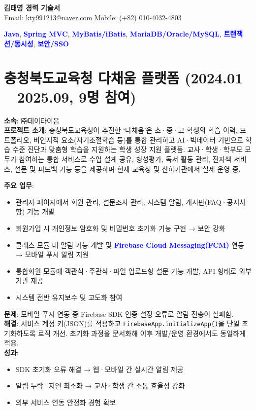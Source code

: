 \documentclass[a4paper,11pt]{article}
\newcommand{\tech}[1]{\textbf{\textcolor{blue}{#1}}}
\begin{document}
\begin{center}
    {\LARGE \textbf{김태영 경력 기술서}} \\[6pt]
    Email: \href{mailto:kty991213@naver.com}{kty991213@naver.com} \quad
    Mobile: (+82) 010-4032-4803
\end{center}

\vspace{0.5cm}

\noindent \tech{Java}, \tech{Spring MVC}, \tech{MyBatis/iBatis}, \tech{MariaDB/Oracle/MySQL}, \tech{트랜잭션/동시성}, \tech{보안/SSO}

\section{충청북도교육청 다채움 플랫폼 (2024.01 ~ 2025.09, 9명 참여)}

\textbf{소속}: ㈜데이타이음 \\
\textbf{프로젝트 소개}:  
충청북도교육청이 추진한 ‘다채움’은 초·중·고 학생의 학습 이력, 포트폴리오,  
비인지적 요소(자기조절학습 등)를 통합 관리하고 AI·빅데이터 기반으로 학습 수준 진단과  
맞춤형 학습을 지원하는 학생 성장 지원 플랫폼.  
교사·학생·학부모 모두가 참여하는 통합 서비스로 수업 설계 공유, 형성평가, 독서 활동 관리,  
전자책 서비스, 설문 및 피드백 기능 등을 제공하며 현재 교육청 및 산하기관에서 실제 운영 중.

\textbf{주요 업무}:
\begin{itemize}[leftmargin=*]
  \item 관리자 페이지에서 회원 관리, 설문조사 관리, 시스템 알림, 게시판(FAQ·공지사항) 기능 개발
  \item 회원가입 시 개인정보 암호화 및 비밀번호 초기화 기능 구현 → 보안 강화
  \item 클래스 모듈 내 알림 기능 개발 및 \tech{Firebase Cloud Messaging(FCM)} 연동 → 모바일 푸시 알림 지원
  \item 통합회원 모듈에 객관식·주관식·파일 업로드형 설문 기능 개발, API 형태로 외부 기관 제공
  \item 시스템 전반 유지보수 및 고도화 참여
\end{itemize}

\textbf{문제}: 모바일 푸시 연동 중 Firebase SDK 인증 설정 오류로 알림 전송이 실패함. \\
\textbf{해결}: 서비스 계정 키(JSON)를 적용하고 \verb|FirebaseApp.initializeApp()|을 단일 초기화하도록 로직 개선. 초기화 과정을 문서화해 이후 개발/운영 환경에서도 동일하게 적용. \\
\textbf{성과}:
\begin{itemize}[leftmargin=*]
  \item SDK 초기화 오류 해결 → 웹·모바일 간 실시간 알림 제공
  \item 알림 누락·지연 최소화 → 교사·학생 간 소통 효율성 강화
  \item 외부 서비스 연동 안정화 경험 확보
\end{itemize}
\end{document}
